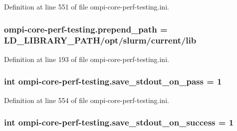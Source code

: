 Definition at line 551 of file ompi-\/core-\/perf-\/testing.\-ini.

\hypertarget{namespaceompi-core-perf-testing_af79469a4a6041fcd16be3bde9d09e109}{
\subsubsection[{prepend\-\_\-path}]{\setlength{\rightskip}{0pt plus 5cm}ompi-\/core-\/perf-\/testing.\-prepend\-\_\-path = L\-D\-\_\-\-L\-I\-B\-R\-A\-R\-Y\-\_\-\-P\-A\-T\-H/opt/slurm/current/lib}}\label{namespaceompi-core-perf-testing_af79469a4a6041fcd16be3bde9d09e109}


Definition at line 193 of file ompi-\/core-\/perf-\/testing.\-ini.

\hypertarget{namespaceompi-core-perf-testing_a28f3564fe5f05f94d7a3070664b594b7}{
\subsubsection[{save\-\_\-stdout\-\_\-on\-\_\-pass}]{\setlength{\rightskip}{0pt plus 5cm}int ompi-\/core-\/perf-\/testing.\-save\-\_\-stdout\-\_\-on\-\_\-pass = 1}}\label{namespaceompi-core-perf-testing_a28f3564fe5f05f94d7a3070664b594b7}


Definition at line 554 of file ompi-\/core-\/perf-\/testing.\-ini.

\hypertarget{namespaceompi-core-perf-testing_a5b495b6fffd94577499d4288abc7839b}{
\subsubsection[{save\-\_\-stdout\-\_\-on\-\_\-success}]{\setlength{\rightskip}{0pt plus 5cm}int ompi-\/core-\/perf-\/testing.\-save\-\_\-stdout\-\_\-on\-\_\-success = 1}}\label{namespaceompi-core-perf-testing_a5b495b6fffd94577499d4288abc7839b}


